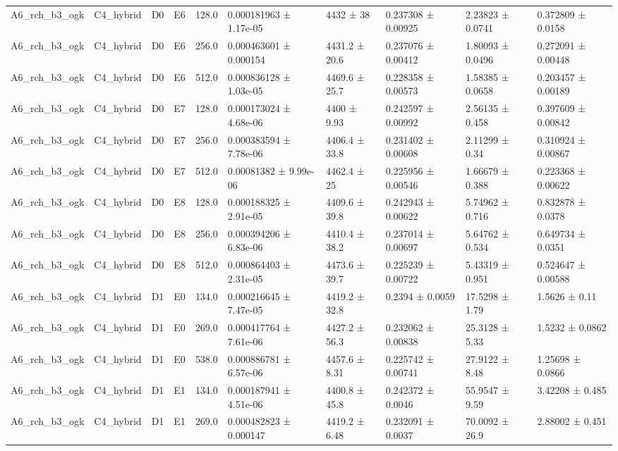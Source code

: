 \begin{table}
\begin{tabular}{llllllllll}
A6\_rch\_b3\_ogk & C4\_hybrid & D0 & E6 & 128.0 & 0.000181963 ± 1.17e-05 & 4432 ± 38 & 0.237308 ± 0.00925 & 2.23823 ± 0.0741 & 0.372809 ± 0.0158 \\
A6\_rch\_b3\_ogk & C4\_hybrid & D0 & E6 & 256.0 & 0.000463601 ± 0.000154 & 4431.2 ± 20.6 & 0.237076 ± 0.00412 & 1.80093 ± 0.0496 & 0.272091 ± 0.00448 \\
A6\_rch\_b3\_ogk & C4\_hybrid & D0 & E6 & 512.0 & 0.000836128 ± 1.03e-05 & 4469.6 ± 25.7 & 0.228358 ± 0.00573 & 1.58385 ± 0.0658 & 0.203457 ± 0.00189 \\
A6\_rch\_b3\_ogk & C4\_hybrid & D0 & E7 & 128.0 & 0.000173024 ± 4.68e-06 & 4400 ± 9.93 & 0.242597 ± 0.00992 & 2.56135 ± 0.458 & 0.397609 ± 0.00842 \\
A6\_rch\_b3\_ogk & C4\_hybrid & D0 & E7 & 256.0 & 0.000383594 ± 7.78e-06 & 4406.4 ± 33.8 & 0.231402 ± 0.00608 & 2.11299 ± 0.34 & 0.310924 ± 0.00867 \\
A6\_rch\_b3\_ogk & C4\_hybrid & D0 & E7 & 512.0 & 0.00081382 ± 9.99e-06 & 4462.4 ± 25 & 0.225956 ± 0.00546 & 1.66679 ± 0.388 & 0.223368 ± 0.00622 \\
A6\_rch\_b3\_ogk & C4\_hybrid & D0 & E8 & 128.0 & 0.000188325 ± 2.91e-05 & 4409.6 ± 39.8 & 0.242943 ± 0.00622 & 5.74962 ± 0.716 & 0.832878 ± 0.0378 \\
A6\_rch\_b3\_ogk & C4\_hybrid & D0 & E8 & 256.0 & 0.000394206 ± 6.83e-06 & 4410.4 ± 38.2 & 0.237014 ± 0.00697 & 5.64762 ± 0.534 & 0.649734 ± 0.0351 \\
A6\_rch\_b3\_ogk & C4\_hybrid & D0 & E8 & 512.0 & 0.000864403 ± 2.31e-05 & 4473.6 ± 39.7 & 0.225239 ± 0.00722 & 5.43319 ± 0.951 & 0.524647 ± 0.00588 \\
A6\_rch\_b3\_ogk & C4\_hybrid & D1 & E0 & 134.0 & 0.000216645 ± 7.47e-05 & 4419.2 ± 32.8 & 0.2394 ± 0.0059 & 17.5298 ± 1.79 & 1.5626 ± 0.11 \\
A6\_rch\_b3\_ogk & C4\_hybrid & D1 & E0 & 269.0 & 0.000417764 ± 7.61e-06 & 4427.2 ± 56.3 & 0.232062 ± 0.00838 & 25.3128 ± 5.33 & 1.5232 ± 0.0862 \\
A6\_rch\_b3\_ogk & C4\_hybrid & D1 & E0 & 538.0 & 0.000886781 ± 6.57e-06 & 4457.6 ± 8.31 & 0.225742 ± 0.00741 & 27.9122 ± 8.48 & 1.25698 ± 0.0866 \\
A6\_rch\_b3\_ogk & C4\_hybrid & D1 & E1 & 134.0 & 0.000187941 ± 4.51e-06 & 4400.8 ± 45.8 & 0.242372 ± 0.0046 & 55.9547 ± 9.59 & 3.42208 ± 0.485 \\
A6\_rch\_b3\_ogk & C4\_hybrid & D1 & E1 & 269.0 & 0.000482823 ± 0.000147 & 4419.2 ± 6.48 & 0.232091 ± 0.0037 & 70.0092 ± 26.9 & 2.88002 ± 0.451 \\

\end{tabular}
\end{table}
